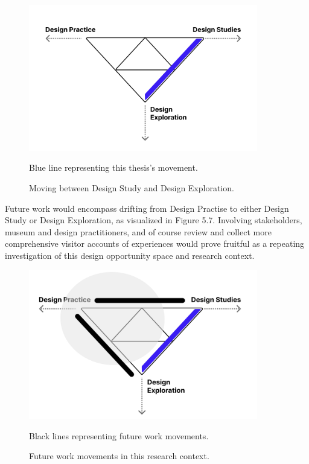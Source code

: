  \begin{figure}[H]
\centering
\includegraphics[width=10cm]{pictures/methodology/fallman_applied.png}
\caption{Moving between Design Study and Design Exploration.} {Blue line representing this thesis's movement.}
\end{figure}

Future work would encompass drifting from Design Practise to either Design Study or Design Exploration, as visualized in Figure 5.7. Involving stakeholders, museum and design practitioners, and of course review and collect more comprehensive visitor accounts of experiences would prove fruitful as a repeating investigation of this design opportunity space and research context.

\begin{figure}[H]
\centering
\includegraphics[width=10cm]{pictures/methodology/fallman_future.png}
\caption{Future work movements in this research context.} {Black lines representing future work movements.}
\end{figure}
    